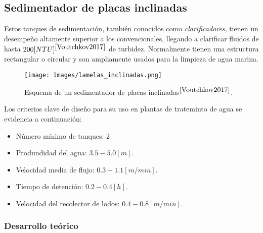 \newpage

\subsection{Sedimentador de placas inclinadas}

\noindent
\justify

Estos tanques de sedimentaci\'on, tambi\'en conocidos como \textit{clarificadores}, tienen un desempe\~no altamente superior a los convencionales, llegando a clarificar fluidos de hasta $200 [NTU]^{\cite{Voutchkov2017}}$ de turbidez. Normalmente tienen una estructura rectangular o circular y son ampliamente usados para la limpieza de agua marina. 

\begin{figure}[h!]
	\centering
	\texttt{[image: Images/lamelas\_inclinadas.png]}
	\caption{Esquema de un sedimentador de placas inclinadas$^{\cite{Voutchkov2017}}$.}
	\label{lamelas_inclinadas}
\end{figure}


\noindent
\justify

Los criterios clave de dise\~no para su uso en plantas de trateminto de agua se evidencia a continuaci\'on:

\begin{itemize}
	\item N\'umero m\'inimo de tanques: 2
	\item Produndidad del agua: $3.5 - 5.0 [m]$.
	\item Velocidad media de flujo: $0.3 - 1.1 [m/min]$.
	\item Tiempo de detenci\'on: $0.2 - 0.4 [h]$.
	\item Velocidad del recolector de lodos: $0.4 - 0.8 [m/min]$.
\end{itemize}

\subsubsection{Desarrollo te\'orico}

\noindent
\justify

